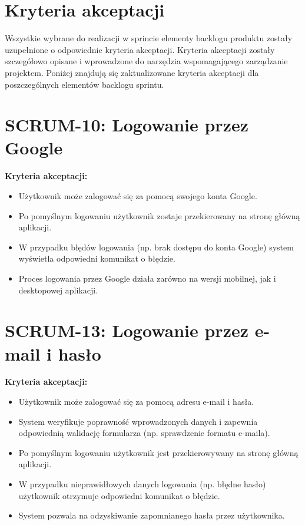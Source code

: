 \documentclass[12pt,a4paper,colorlinks=true,linkcolor=NavyBlue,citecolor=red,urlcolor=NavyBlue]{book}
\begin{document}
\section{Kryteria akceptacji}
Wszystkie wybrane do realizacji w sprincie elementy backlogu produktu zostały uzupełnione o odpowiednie kryteria akceptacji. Kryteria akceptacji zostały szczegółowo opisane i wprowadzone do narzędzia wspomagającego zarządzanie projektem. Poniżej znajdują się zaktualizowane kryteria akceptacji dla poszczególnych elementów backlogu sprintu.

\section{SCRUM-10: Logowanie przez Google}
\textbf{Kryteria akceptacji:}
\begin{itemize}[topsep=0.1pt, itemsep=0.3em]
    \item Użytkownik może zalogować się za pomocą swojego konta Google.
    \item Po pomyślnym logowaniu użytkownik zostaje przekierowany na stronę główną aplikacji.
    \item W przypadku błędów logowania (np. brak dostępu do konta Google) system wyświetla odpowiedni komunikat o błędzie.
    \item Proces logowania przez Google działa zarówno na wersji mobilnej, jak i desktopowej aplikacji.
\end{itemize}

\section{SCRUM-13: Logowanie przez e-mail i hasło}
\textbf{Kryteria akceptacji:}
\begin{itemize}[topsep=0.1pt, itemsep=0.3em]
    \item Użytkownik może zalogować się za pomocą adresu e-mail i hasła.
    \item System weryfikuje poprawność wprowadzonych danych i zapewnia odpowiednią walidację formularza (np. sprawdzenie formatu e-maila).
    \item Po pomyślnym logowaniu użytkownik jest przekierowywany na stronę główną aplikacji.
    \item W przypadku nieprawidłowych danych logowania (np. błędne hasło) użytkownik otrzymuje odpowiedni komunikat o błędzie.
    \item System pozwala na odzyskiwanie zapomnianego hasła przez użytkownika.
\end{itemize}
\end{document}

